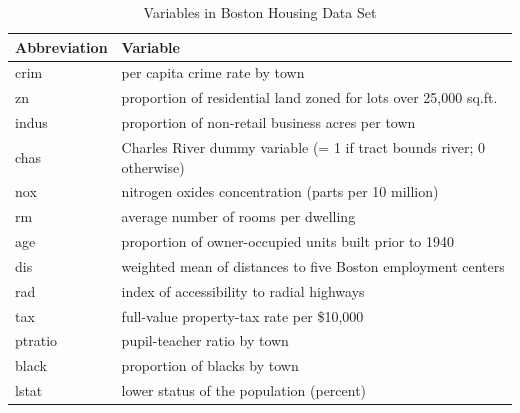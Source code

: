 \documentclass[ejs,authoryear,linksfromyear]{imsart}
\numberwithin{equation}{section}
\theoremstyle{plain}
\begin{document}
\begin{table}[h!] 
	\caption{Variables in Boston Housing Data Set} \label{tabl:housing_variable}
	\centering
	\begin{tabular}{l|l}
		\hline
		Abbreviation & Variable \\
		\hline
		crim & per capita crime rate by town \\
		zn & proportion of residential land zoned for lots over 25,000 sq.ft. \\
		indus & proportion of non-retail business acres per town \\
		chas & Charles River dummy variable (= 1 if tract bounds river; 0 otherwise) \\
		nox & nitrogen oxides concentration (parts per 10 million) \\
		rm & average number of rooms per dwelling \\
		age & proportion of owner-occupied units built prior to 1940 \\
		dis & weighted mean of distances to five Boston employment centers \\
		rad & index of accessibility to radial highways \\
		tax & full-value property-tax rate per \$10,000 \\
		ptratio & pupil-teacher ratio by town \\
		black & proportion of blacks by town \\
		lstat & lower status of the population (percent) \\
		\hline
\end{tabular}
\end{table}
\end{document}
